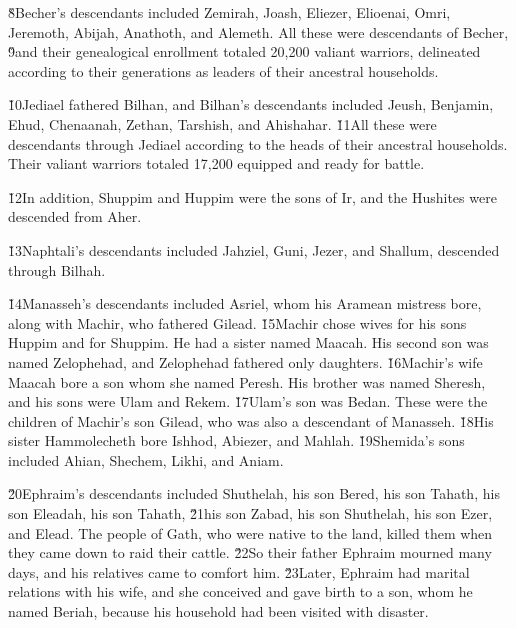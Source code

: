 \v{8}Becher's descendants included Zemirah, Joash, Eliezer, Elioenai, Omri, Jeremoth, Abijah, Anathoth, and Alemeth. All these were descendants of Becher, \v{9}and their genealogical enrollment totaled 20,200 valiant warriors, delineated according to their generations as leaders of their ancestral households.

\v{10}Jediael fathered Bilhan, and Bilhan's descendants included Jeush, Benjamin, Ehud, Chenaanah, Zethan, Tarshish, and Ahishahar. \v{11}All these were descendants through Jediael according to the heads of their ancestral households. Their valiant warriors totaled 17,200 equipped and ready for battle.

\v{12}In addition, Shuppim and Huppim were the sons of Ir, and the Hushites were descended from Aher.

\v{13}Naphtali's descendants included Jahziel, Guni, Jezer, and Shallum, descended through Bilhah.

\v{14}Manasseh's descendants included Asriel, whom his Aramean mistress bore, along with Machir, who fathered Gilead. \v{15}Machir chose wives for his sons Huppim and for Shuppim. He had a sister named Maacah. His second son was named Zelophehad, and Zelophehad fathered only daughters. \v{16}Machir's wife Maacah bore a son whom she named Peresh. His brother was named Sheresh, and his sons were Ulam and Rekem. \v{17}Ulam's son was Bedan. These were the children of Machir's son Gilead, who was also a descendant of Manasseh. \v{18}His sister Hammolecheth bore Ishhod, Abiezer, and Mahlah. \v{19}Shemida's sons included Ahian, Shechem, Likhi, and Aniam.

\v{20}Ephraim's descendants included Shuthelah, his son Bered, his son Tahath, his son Eleadah, his son Tahath, \v{21}his son Zabad, his son Shuthelah, his son Ezer, and Elead. The people of Gath, who were native to the land, killed them when they came down to raid their cattle. \v{22}So their father Ephraim mourned many days, and his relatives came to comfort him. \v{23}Later, Ephraim had marital relations with his wife, and she conceived and gave birth to a son, whom he named Beriah, because his household had been visited with disaster.

